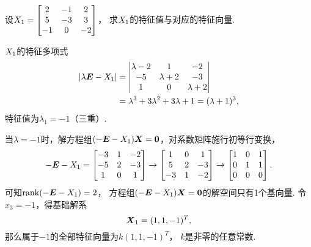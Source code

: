 \begin{example}
设\(X_1 = \begin{bmatrix}
	2 & -1 & 2 \\
	5 & -3 & 3 \\
	-1 & 0 & -2
\end{bmatrix}\)，
求\(X_1\)的特征值与对应的特征向量.
\begin{solution}
\(X_1\)的特征多项式\begin{align*}
	\abs{\lambda\boldsymbol{E}-X_1}
	&= \begin{vmatrix}
		\lambda-2 & 1 & -2 \\
		-5 & \lambda+2 & -3 \\
		1 & 0 & \lambda+2
	\end{vmatrix} \\
	&= \lambda^3 + 3\lambda^2 + 3\lambda + 1
	= (\lambda+1)^3,
\end{align*}
特征值为\(\lambda_1=-1\)（三重）.

当\(\lambda=-1\)时，解方程组\((-\boldsymbol{E}-X_1)\boldsymbol{X} = \boldsymbol{0}\)，对系数矩阵施行初等行变换，\[
	-\boldsymbol{E}-X_1 = \begin{bmatrix}
		-3 & 1 & -2 \\
		-5 & 2 & -3 \\
		1 & 0 & 1
	\end{bmatrix} \to \begin{bmatrix}
		1 & 0 & 1 \\
		5 & 2 & -3 \\
		-3 & 1 & -2
	\end{bmatrix} \to \begin{bmatrix}
		1 & 0 & 1 \\
		0 & 1 & 1 \\
		0 & 0 & 0
	\end{bmatrix}.
\]
可知\(\rank(-\boldsymbol{E}-X_1) = 2\)，
方程组\((-\boldsymbol{E}-X_1)\boldsymbol{X} = \boldsymbol{0}\)的解空间只有1个基向量.
令\(x_3 = -1\)，得基础解系\[
	\boldsymbol{X}_1 = (1,1,-1)^T,
\]
那么属于\(-1\)的全部特征向量为\(k (1,1,-1)^T\)，
\(k\)是非零的任意常数.
\end{solution}
\end{example}

